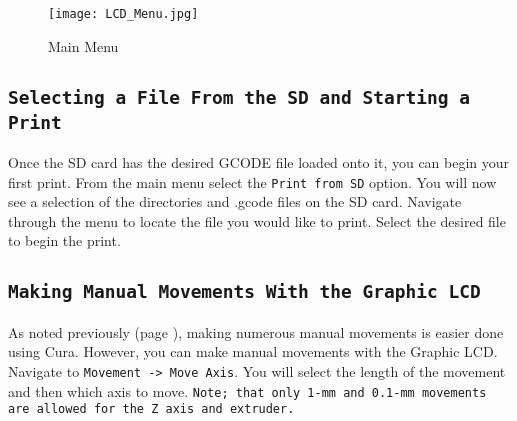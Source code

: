 \begin{figure}[h]
\centering
\texttt{[image: LCD\_Menu.jpg]}
\caption{Main Menu}
\label{fig:main_menu}
\end{figure}



\subsection{\texttt{Selecting a File From the SD and Starting a Print}}
Once the SD card has the desired GCODE file loaded onto it, you can begin your first print. From the main menu select the \texttt{Print from SD} option. You will now see a selection of the directories and .gcode files on the SD card. Navigate through the menu to locate the file you would like to print. Select the desired file to begin the print.


\subsection{\texttt{Making Manual Movements With the Graphic LCD}}
As noted previously (page \pageref{sec:Graphic LCD, Cura or Other Host?}), making numerous manual movements is easier done using Cura. However, you can make manual movements with the Graphic LCD. Navigate to \texttt{Movement -> Move Axis}. You will select the length of the movement and then which axis to move. \texttt{Note; that only 1-mm and 0.1-mm movements are allowed for the Z axis and extruder.}


